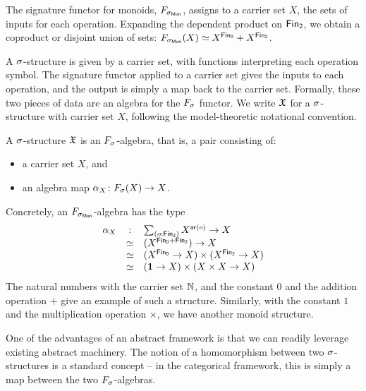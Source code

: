 \begin{example}
    The signature functor for monoids, $\SigMon$, assigns to a carrier set $X$,
    the sets of inputs for each operation.
    Expanding the dependent product on $\Fin[2]$, we obtain a coproduct or disjoint union of sets:
    $\SigMon(X) \eqv X^{\Fin[0]} + X^{\Fin[2]}$.
\end{example}

A $\sigma$-structure is given by a carrier set, with functions interpreting each operation symbol.
%
The signature functor applied to a carrier set gives the inputs to each operation, and the output is simply a map back
to the carrier set.
%
Formally, these two pieces of data are an algebra for the $\Sig$ functor.
%
We write $\mathfrak{X}$ for a $\sigma$-structure with carrier set $X$, following the model-theoretic notational convention.

\begin{definition}[Structure]
    A $\sigma$-structure $\mathfrak{X}$ is an $\Sig$-algebra, that is, a pair consisting of:
    \begin{itemize}
        \item a carrier set $X$, and
        \item an algebra map $\alpha_{X}\colon \Sig(X) \to X$.
    \end{itemize}
\end{definition}

\begin{example}
    Concretely, an $\SigMon$-algebra has the type
    \[
        \begin{array}{rcl}
            \alpha_{X} & :    & \dsum{o:\Fin[2]}{X^{\term{ar}(o)}} \to X       \\
                       & \eqv & (X^{\Fin[0] + \Fin[2]}) \to X                  \\
                       & \eqv & (X^{\Fin[0]} \to X) \times (X^{\Fin[2]} \to X) \\
                       & \eqv & (\unitt \to X) \times (X \times X \to X)
        \end{array}
    \]
    The natural numbers with the carrier set $\mathbb{N}$,
    and the constant $0$ and the addition operation $+$ give an example of such a structure.
    Similarly, with the constant $1$ and the multiplication operation $\times$, we have another monoid structure.
\end{example}

One of the advantages of an abstract framework is that we can readily leverage existing abstract machinery.
%
The notion of a homomorphism between two $\sigma$-structures is a standard concept --
in the categorical framework, this is simply a map between the two $\Sig$-algebras.

